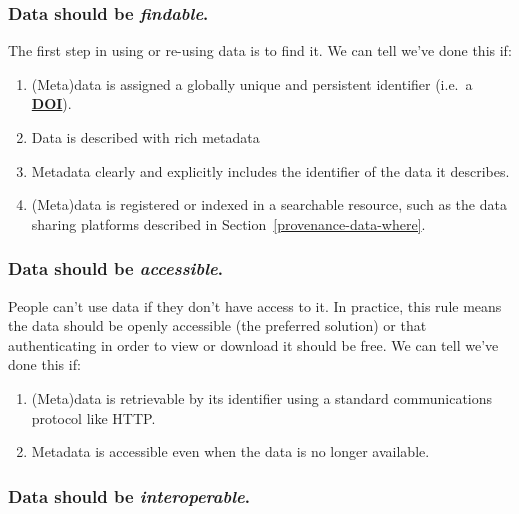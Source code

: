 \documentclass[
]{krantz}
\providecommand{\tightlist}{%
  \setlength{\itemsep}{0pt}\setlength{\parskip}{0pt}}
\newcommand{\gref}[2]{\hyperlink{#2}{\textbf{#1}}}
\begin{document}
\hypertarget{data-should-be-findable.}{%
\subsubsection{\texorpdfstring{Data should be \emph{findable}.}{Data should be findable.}}\label{data-should-be-findable.}}

The first step in using or re-using data is to find it.
We can tell we've done this if:

\begin{enumerate}
\def\labelenumi{\arabic{enumi}.}
\tightlist
\item
  (Meta)data is assigned a globally unique and persistent identifier
  (i.e.~a \gref{DOI}{doi}).
\item
  Data is described with rich metadata
\item
  Metadata clearly and explicitly includes the identifier of the data it describes.
\item
  (Meta)data is registered or indexed in a searchable resource,
  such as the data sharing platforms described in Section~\ref{provenance-data-where}.
\end{enumerate}

\hypertarget{data-should-be-accessible.}{%
\subsubsection{\texorpdfstring{Data should be \emph{accessible}.}{Data should be accessible.}}\label{data-should-be-accessible.}}

People can't use data if they don't have access to it.
In practice,
this rule means the data should be openly accessible (the preferred solution)
or that authenticating in order to view or download it should be free.
We can tell we've done this if:

\begin{enumerate}
\def\labelenumi{\arabic{enumi}.}
\tightlist
\item
  (Meta)data is retrievable by its identifier
  using a standard communications protocol like HTTP.
\item
  Metadata is accessible even when the data is no longer available.
\end{enumerate}

\hypertarget{data-should-be-interoperable.}{%
\subsubsection{\texorpdfstring{Data should be \emph{interoperable}.}{Data should be interoperable.}}\label{data-should-be-interoperable.}}
\end{document}
